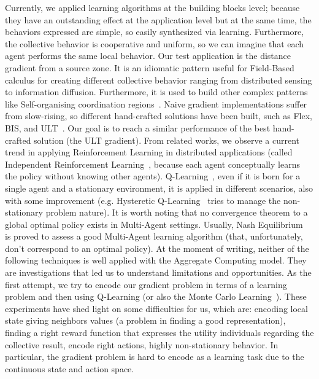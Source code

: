 \documentclass[conference]{IEEEtran}
\begin{document}
Currently, we applied learning algorithms at the building blocks level; because they have an outstanding effect at the application level but
at the same time, the behaviors expressed are simple, so easily synthesized via learning.
Furthermore, the collective behavior is cooperative and uniform, so we can imagine that each agent performs the same local behavior.  %
%
Our test application is the distance gradient from a source zone. 
It is an idiomatic pattern useful for Field-Based calculus for creating different collective behavior ranging from distributed sensing to information diffusion.
Furthermore, it is used to build other complex patterns like Self-organising coordination regions~\cite{DBLP:conf/coordination/CasadeiPVN19}.
%
Naive gradient implementations suffer from slow-rising, so different hand-crafted solutions have been built, such as Flex, BIS, and ULT~\cite{DBLP:conf/saso/AudritoCDV17}.
Our goal is to reach a similar performance of the best hand-crafted solution (the ULT gradient).
%
From related works, we observe a current trend in applying Reinforcement Learning in distributed applications (called Independent Reinforcement Learning~\cite{DBLP:conf/icml/Tan93}, because each agent conceptually learns the policy without knowing other agents).
Q-Learning~\cite{DBLP:journals/ras/Krose95}, even if it is born for a single agent and a stationary environment, it is applied in different scenarios, also with some improvement (e.g. Hysteretic Q-Learning~\cite{DBLP:conf/iros/MatignonLF07} tries to manage the non-stationary problem nature).
It is worth noting that no convergence theorem to a global optimal policy exists in Multi-Agent settings. 
Usually, Nash Equilibrium~\cite{DBLP:conf/icml/HuW98} is proved to assess a good Multi-Agent learning algorithm (that, unfortunately, don't correspond to an optimal policy).
%
At the moment of writing, neither of the following techniques is well applied with the Aggregate Computing model. They are investigations that led us to understand limitations and opportunities.
%
As the first attempt, we try to encode our gradient problem in terms of a learning problem and then using Q-Learning (or also the Monte Carlo Learning~\cite{DBLP:conf/nips/Thrun99}).
These experiments have shed light on some difficulties for us, which are: encoding local state giving neighbors values (a problem in finding a good representation), finding a right reward function that expresses the utility individuals
regarding the collective result, encode right actions, highly non-stationary behavior. 
%
In particular, the gradient problem is hard to encode as a learning task due to the continuous state and action space.
\end{document}
